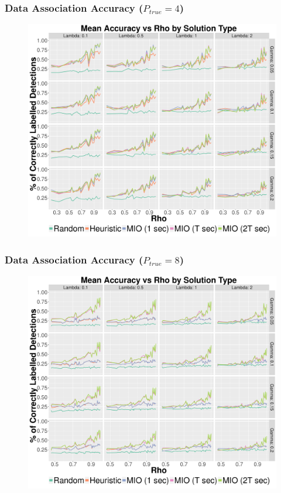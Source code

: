 \documentclass{beamer}
\begin{document}
\begin{frame}
\frametitle{Data Association Accuracy ($P_{true}=4$)} 
\begin{figure}[ht]
  \centering
  \includegraphics[width=.7\columnwidth]{../Figures/4_8_Accuracy}
\end{figure}
\end{frame}

\begin{frame}
\frametitle{Data Association Accuracy ($P_{true}=8$)} 
\begin{figure}[ht]
  \centering
  \includegraphics[width=.7\columnwidth]{../Figures/8_8_Accuracy}
\end{figure}
\end{frame}
\end{document}

